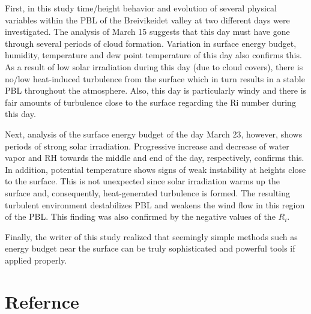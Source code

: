 \documentclass[a4paper,12pt]{article}
\numberwithin{equation}{section} %
\begin{document}
First, in this study time/height behavior and evolution of several physical variables within the PBL of the Breivikeidet valley at two different days were investigated. The analysis of March 15 suggests that this day must have gone through several periods of cloud formation. Variation in surface energy budget, humidity, temperature and dew point temperature of this day also confirms this. As a result of low solar irradiation during this day (due to cloud covers), there is no/low heat-induced turbulence from the surface which in turn results in a stable PBL throughout the atmosphere. Also, this day is particularly windy and there is fair amounts of turbulence close to the surface regarding the Ri number during this day.

Next, analysis of the surface energy budget of the day March 23, however, shows periods of strong solar irradiation. Progressive increase and decrease of water vapor and RH towards the middle and end of the day, respectively, confirms this. In addition, potential temperature shows signs of weak instability at heights close to the surface. This is not unexpected since solar irradiation warms up the surface and, consequently, heat-generated turbulence is formed. The resulting turbulent environment destabilizes PBL and weakens the wind flow in this region of the PBL. This finding was also confirmed by the negative values of the $R_i$.

Finally, the writer of this study realized that seemingly simple methods such as energy budget near the surface can be truly sophisticated and powerful tools if applied properly. 

\newpage

\section*{Refernce}


\end{document}
